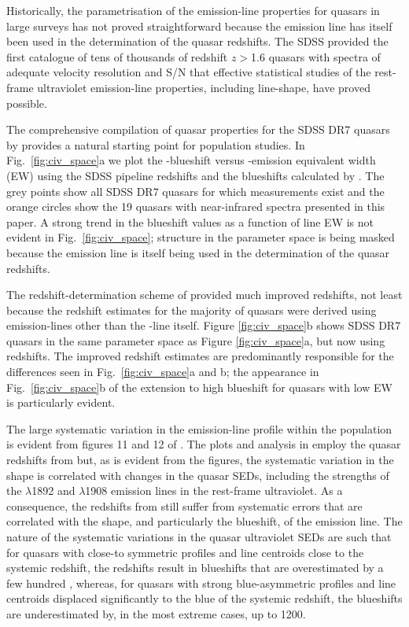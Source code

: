 Historically, the parametrisation of the  emission-line properties for quasars in large surveys has not proved straightforward because the  emission line has itself been used in the determination of the quasar redshifts. 
The SDSS provided the first catalogue of tens of thousands of redshift $z>$1.6 quasars with spectra of adequate velocity resolution and S/N that effective statistical studies of the rest-frame ultraviolet emission-line properties, including line-shape, have proved possible.

The comprehensive compilation of quasar properties for the SDSS DR7 quasars by \citet{shen11} provides a natural starting point for population studies. 
In Fig.~\ref{fig:civ_space}a we plot the -blueshift versus -emission equivalent width (EW) using the SDSS pipeline redshifts and the blueshifts calculated by \citet{shen11}. 
The grey points show all SDSS DR7 quasars for which measurements exist and the orange circles show the 19 quasars with near-infrared spectra presented in this paper.  
A strong trend in the blueshift values as a function of line EW is not evident in Fig.~\ref{fig:civ_space}; structure in the parameter space is being masked because the  emission line is itself being used in the determination of the quasar redshifts. 

The redshift-determination scheme of \citet{hewett10} provided much improved redshifts, not least because the redshift estimates for the majority of quasars were derived using emission-lines other than the -line itself. 
Figure \ref{fig:civ_space}b shows SDSS DR7 quasars in the same  parameter space as Figure \ref{fig:civ_space}a, but now using \citet{hewett10} redshifts. 
The improved redshift estimates are predominantly responsible for the differences seen in Fig.~\ref{fig:civ_space}a and b; the appearance in Fig.~\ref{fig:civ_space}b of the extension to high blueshift for quasars with low  EW is particularly evident.

The large systematic variation in the  emission-line profile within the population is evident from figures 11 and 12 of \citet{richards11}. 
The plots and analysis in \citet{richards11} employ the quasar redshifts from \citet{hewett10} but, as is evident from the figures, the systematic variation in the  shape is correlated with changes in the quasar SEDs, including the strengths of the $\lambda$1892 and $\lambda$1908 emission lines in the rest-frame ultraviolet. As a consequence, the redshifts from \citet{hewett10} still suffer from systematic errors that are correlated with the shape, and particularly the blueshift, of the  emission line.
The nature of the systematic variations in the quasar ultraviolet SEDs are such that for quasars with close-to symmetric  profiles and line centroids close to the systemic redshift, the \citet{hewett10} redshifts result in  blueshifts that are overestimated by a few hundred \kms, whereas, for quasars with strong blue-asymmetric  profiles and line centroids displaced significantly to the blue of the systemic redshift, the  blueshifts are underestimated by, in the most extreme cases, up to 1200\kms. 

